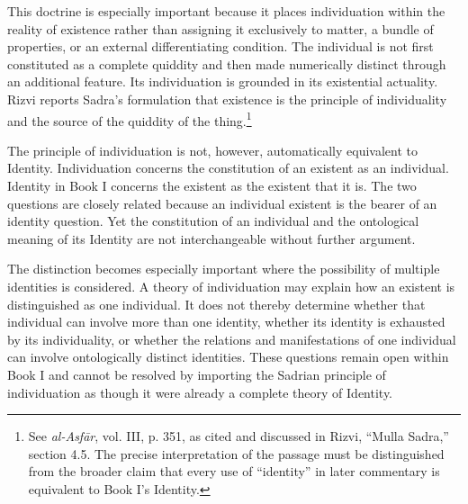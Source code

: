 \label{para:VS.B01.P01.C08.S17.SS08.P002}

This doctrine is especially
important because it places
individuation within the reality
of existence rather than
assigning it exclusively to
matter, a bundle of properties,
or an external differentiating
condition. The individual is
not first constituted as
a complete quiddity and then
made numerically distinct
through an additional feature.
Its individuation is grounded
in its existential actuality.
Rizvi reports Sadra's formulation
that existence is the principle
of individuality and the source
of the quiddity of the thing.\footnote{See
\textit{al-Asfār}, vol. III,
p. 351, as cited and discussed
in Rizvi, ``Mulla Sadra,''
section 4.5. The precise
interpretation of the passage
must be distinguished from
the broader claim that every
use of ``identity'' in later
commentary is equivalent
to Book I's Identity.}

\label{para:VS.B01.P01.C08.S17.SS08.P003}

The principle of individuation
is not, however, automatically
equivalent to Identity. Individuation
concerns the constitution
of an existent as an individual.
Identity in Book I concerns
the existent as the existent
that it is. The two questions
are closely related because
an individual existent is
the bearer of an identity
question. Yet the constitution
of an individual and the
ontological meaning of its
Identity are not interchangeable
without further argument.

\label{para:VS.B01.P01.C08.S17.SS08.P004}

The distinction becomes especially
important where the possibility
of multiple identities is
considered. A theory of individuation
may explain how an existent
is distinguished as one individual.
It does not thereby determine
whether that individual can
involve more than one identity,
whether its identity is exhausted
by its individuality, or whether
the relations and manifestations
of one individual can involve
ontologically distinct identities.
These questions remain open
within Book I and cannot
be resolved by importing
the Sadrian principle of
individuation as though it
were already a complete theory
of Identity.

\label{para:VS.B01.P01.C08.S17.SS08.P005}

